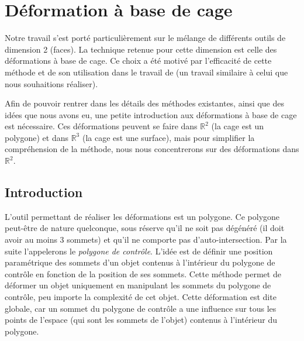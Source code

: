 

\chapter{Déformation à base de cage}

\graphicspath{ {Chapter2/Chapter2Figs/PNG/}
  {Chapter2/Chapter2Figs/PDF/} {Chapter2/Chapter2Figs/} }

Notre travail s'est porté particulièrement sur le mélange de différents outils
de dimension 2 (faces). La technique retenue pour cette dimension est celle des
déformations à base de cage. Ce choix a été motivé par l'efficacité de cette
méthode et de son utilisation dans le travail de \cite{GPCP13} (un travail
similaire à celui que nous souhaitions réaliser).

Afin de pouvoir rentrer dans les détails des méthodes existantes, ainsi que des
idées que nous avons eu, une petite introduction aux déformations à base de cage
est nécessaire. Ces déformations peuvent se faire dans $\mathbb{R}^2$ (la cage
est un polygone) et dans $\mathbb{R}^3$ (la cage est une surface), mais pour
simplifier la compréhension de la méthode, nous nous concentrerons sur des
déformations dans $\mathbb{R}^2$.

\section{Introduction} 

L'outil permettant de réaliser les déformations est un polygone. Ce polygone
peut-être de nature quelconque, sous réserve qu'il ne soit pas dégénéré (il doit
avoir au moins 3 sommets) et qu'il ne comporte pas d'auto-intersection. Par la
suite l'appelerons le \textit{polygone de contrôle}. L'idée est de définir une
position paramétrique des sommets d'un objet contenus à l'intérieur du polygone
de contrôle en fonction de la position de ses sommets. Cette méthode permet de
déformer un objet uniquement en manipulant les sommets du polygone de contrôle,
peu importe la complexité de cet objet. Cette déformation est dite globale, car
un sommet du polygone de contrôle a une influence sur tous les points de
l'espace (qui sont les sommets de l'objet) contenus à l'intérieur du polygone.
\\

